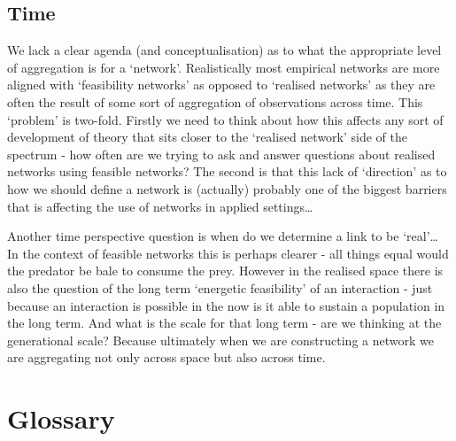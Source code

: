 \documentclass[
]{article}
\begin{document}
\subsection{Time}\label{time}

We lack a clear agenda (and conceptualisation) as to what the
appropriate level of aggregation is for a `network'. Realistically most
empirical networks are more aligned with `feasibility networks' as
opposed to `realised networks' as they are often the result of some sort
of aggregation of observations across time. This `problem' is two-fold.
Firstly we need to think about how this affects any sort of development
of theory that sits closer to the `realised network' side of the
spectrum - how often are we trying to ask and answer questions about
realised networks using feasible networks? The second is that this lack
of `direction' as to how we should define a network is (actually)
probably one of the biggest barriers that is affecting the use of
networks in applied settings\ldots{}

Another time perspective question is when do we determine a link to be
`real'\ldots{} In the context of feasible networks this is perhaps
clearer - all things equal would the predator be bale to consume the
prey. However in the realised space there is also the question of the
long term `energetic feasibility' of an interaction - just because an
interaction is possible in the now is it able to sustain a population in
the long term. And what is the scale for that long term - are we
thinking at the generational scale? Because ultimately when we are
constructing a network we are aggregating not only across space but also
across time.

\section*{Glossary}\label{glossary}
\end{document}
